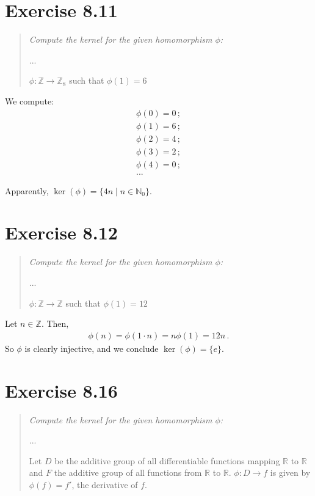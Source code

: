 \documentclass{article}
\begin{document}
\section*{Exercise 8.11}

\begin{quote}
    \itshape
    Compute the kernel for the given homomorphism $\phi$:

    ...

    $\phi : \mathbb{Z} \to \mathbb{Z}_8$ such that $\phi(1) = 6$
\end{quote}

We compute:
\begin{gather*}
    \phi(0) = 0 \,; \\
    \phi(1) = 6 \,; \\
    \phi(2) = 4 \,; \\
    \phi(3) = 2 \,; \\
    \phi(4) = 0 \,; \\
    ...
\end{gather*}

Apparently, $\ker(\phi) = \bigl\{ 4n \;\vert\; n \in \mathbb{N}_0 \bigr\}$.

\section*{Exercise 8.12}

\begin{quote}
    \itshape
    Compute the kernel for the given homomorphism $\phi$:

    ...

    $\phi : \mathbb{Z} \to \mathbb{Z}$ such that $\phi(1) = 12$
\end{quote}

Let $n \in \mathbb{Z}$. Then,
\begin{align*}
    \phi(n) = \phi(1 \cdot n) = n \phi(1) = 12n \,.
\end{align*}
So $\phi$ is clearly injective, and we conclude $\ker(\phi) = \{ e \}$.

\section*{Exercise 8.16}

\begin{quote}
    \itshape
    Compute the kernel for the given homomorphism $\phi$:

    ...

    Let $D$ be the additive group of all differentiable functions mapping
    $\mathbb{R}$ to $\mathbb{R}$ and $F$ the additive group of all functions
    from $\mathbb{R}$ to $\mathbb{R}$. $\phi : D \to f$ is given by
    $\phi(f) = f'$, the derivative of $f$.
\end{quote}
\end{document}

